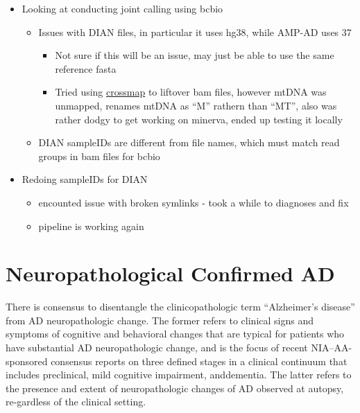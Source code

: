 \documentclass[]{book}
\providecommand{\tightlist}{%
  \setlength{\itemsep}{0pt}\setlength{\parskip}{0pt}}
\begin{document}
\begin{itemize}
\tightlist
\item
  Looking at conducting joint calling using bcbio

  \begin{itemize}
  \tightlist
  \item
    Issues with DIAN files, in particular it uses hg38, while AMP-AD uses 37

    \begin{itemize}
    \tightlist
    \item
      Not sure if this will be an issue, may just be able to use the same reference fasta
    \item
      Tried using \href{https://crossmap.readthedocs.io/en/latest/}{crossmap} to liftover bam files, however mtDNA was unmapped, renames mtDNA as ``M'' rathern than ``MT'', also was rather dodgy to get working on minerva, ended up testing it locally
    \end{itemize}
  \item
    DIAN sampleIDs are different from file names, which must match read groups in bam files for bcbio
  \end{itemize}
\item
  Redoing sampleIDs for DIAN

  \begin{itemize}
  \tightlist
  \item
    encounted issue with broken symlinks - took a while to diagnoses and fix
  \item
    pipeline is working again
  \end{itemize}
\end{itemize}

\hypertarget{neuropathological-confirmed-ad}{%
\section{Neuropathological Confirmed AD}\label{neuropathological-confirmed-ad}}

There is consensus to disentangle the clinicopathologic term ``Alzheimer's disease'' from AD neuropathologic change. The former refers to clinical signs and symptoms of cognitive and behavioral changes that are typical for patients who have substantial AD neuropathologic change, and is the focus of recent NIA--AA-sponsored consensus reports on three defined stages in a clinical continuum that includes preclinical, mild cognitive impairment, anddementia. The latter refers to the presence and extent of neuropathologic changes of AD observed at autopsy, re-gardless of the clinical setting.
\end{document}

